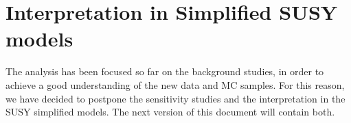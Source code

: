\section{Interpretation in Simplified SUSY models}
\label{sec:susy}
The analysis has been focused so far on the background studies, 
in order to achieve a good understanding of the new data and MC samples. 
For this reason, we have decided to postpone the sensitivity studies and the 
interpretation in the SUSY simplified models.
The next version of this document will contain both. 






